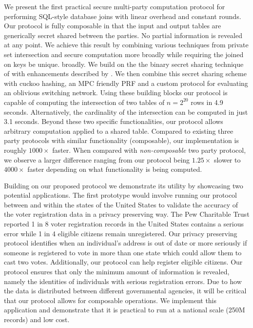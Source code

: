 We present the first practical secure multi-party computation protocol for performing SQL-style database joins with linear overhead and constant rounds. Our protocol is fully composable in that the input and output tables are generically secret shared between the parties. 
\iffullversion
	No partial information is revealed at any point. 
\fi
	We achieve this result by combining various techniques from private set intersection and secure computation more 
\iffullversion 
	broadly while requiring the joined on keys be unique.
\else
	broadly.
\fi
 We build on the the binary secret sharing technique of \cite{highthroughput} with enhancements described by \cite{aby3}. We then combine this secret sharing scheme with cuckoo hashing\cite{usenix:PSZ14}, an MPC friendly PRF\cite{lowmc} and a custom protocol for evaluating an oblivious switching network\cite{MS13}. Using these building blocks our protocol is capable of computing the intersection of two tables of $n=2^{20}$ rows in 4.9 seconds. 
\iffullversion 
	Alternatively, the cardinality of the intersection can be computed in just 3.1 seconds.
\fi
  Beyond these two specific functionalities, our protocol allows arbitrary computation applied to a shared table. Compared to existing three party protocols with similar functionality (composable), our implementation is roughly $1000\times$ faster. When compared with \emph{non-composable} two party protocol, we observe a larger difference ranging from our protocol being $1.25\times$ slower to $4000\times$ faster depending on what functionality is being computed. 


Building on our proposed protocol we demonstrate its utility by showcasing two potential applications. The first prototype would involve running our protocol between and within the states of the United States to validate the accuracy of the voter registration data in a privacy preserving way. The Pew Charitable Trust\cite{pew} reported 1 in 8 voter registration records in the United States contains a serious error while 1 in 4 eligible citizens remain unregistered. Our privacy preserving protocol identifies when an individual's address is out of date or more seriously if someone is registered to vote in more than one state which could allow them to cast two votes. 
\iffullversion
Additionally, our protocol can help register eligible citizens. Our protocol ensures that only the minimum amount of information is revealed, namely the identities of individuals with serious registration errors.
\fi 
Due to how the data is distributed between different governmental agencies, it will be critical that our protocol allows for composable operations. We implement this application and demonstrate that it is practical to run at a national scale (250M records) and low cost.

